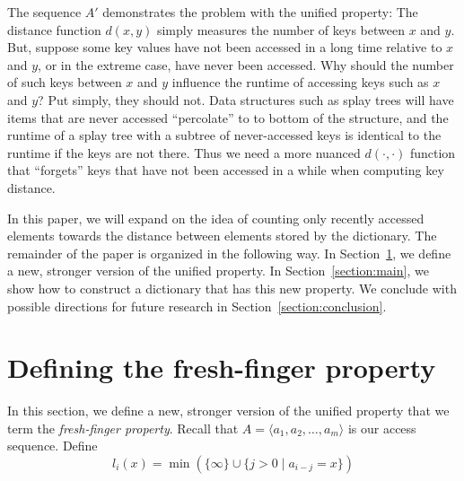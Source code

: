 \documentclass{llncs}
\begin{document}
The sequence $A'$ demonstrates the problem with the unified property: The distance function $d(x,y)$ simply measures the number of keys between $x$ and $y$. But, suppose some key values have not been accessed in a long time relative to $x$ and $y$, or in the extreme case, have never been accessed. Why should the number of such keys between $x$ and $y$ influence the runtime of accessing keys such as $x$ and $y$?
Put simply, they should not. Data structures such as splay trees will have items that are never accessed ``percolate'' to to bottom of the structure, and the runtime of a splay tree with a subtree of never-accessed keys is identical to the runtime if the keys are not there. Thus we need a more nuanced $d(\cdot,\cdot)$ function that ``forgets'' keys that have not been accessed in a while when computing key distance.

In this paper, we will expand on the idea of counting only recently accessed elements towards the distance between elements stored by the dictionary. The remainder of the paper is organized in the following way. In Section~\ref{section:definitions}, we define a new, stronger version of the unified property. In Section~\ref{section:main}, we show how to construct a dictionary that has this new property. We conclude with possible directions for future research in Section~\ref{section:conclusion}.

\section{Defining the fresh-finger property}
\label{section:definitions}

In this section, we define a new, stronger version of the unified property that we term the \emph{fresh-finger property}. Recall that $A = \langle a_1, a_2, \ldots, a_m \rangle$ is our access sequence. Define
\begin{displaymath}
	l_i(x) = \min \left( \{ \infty \} \cup \{ j > 0 \;|\; a_{i-j} = x \} \right)
\end{displaymath}
\end{document}
